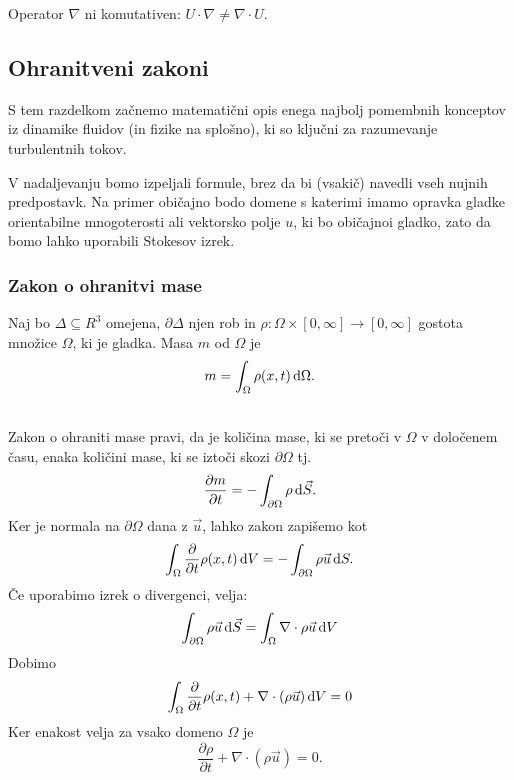\documentclass[mat2, tisk]{fmfdelo}
\begin{document}
\begin{opomba}
Operator $\nabla$ ni komutativen: $U \cdot \nabla \neq \nabla \cdot U$.
\end{opomba}


\subsection{Ohranitveni zakoni}

S tem razdelkom začnemo matematični opis enega najbolj pomembnih konceptov iz dinamike fluidov (in fizike na splošno), 
ki so ključni za razumevanje turbulentnih tokov. 

\begin{opomba}
V nadaljevanju bomo izpeljali formule, brez da bi (vsakič) navedli vseh nujnih predpostavk. Na primer 
običajno bodo domene s katerimi imamo opravka gladke orientabilne mnogoterosti ali vektorsko polje
$u$, ki bo običajnoi gladko, zato da bomo lahko uporabili Stokesov izrek.
\end{opomba}

\subsubsection{Zakon o ohranitvi mase}
Naj bo $\Delta \subseteq R^3$ omejena, $\partial \Delta$ njen rob in $\rho: \Omega \times [0, \infty] \rightarrow [0, \infty]$ 
gostota množice $\Omega$, ki je gladka. Masa $m$ od $\Omega$ je 
$$
m = \int_\Omega \rho(x, t) \dif\Omega.
$$
\begin{center}
\end{center}
~\\[1mm]

Zakon o ohraniti mase pravi, da je količina mase, ki se pretoči v $\Omega$ v določenem času, 
enaka količini mase, ki se iztoči skozi $\partial\Omega$ tj.
$$
\frac{\partial m}{\partial t} = - \int_{\partial \Omega} \rho \dif \vec{S}.
$$
Ker je normala na $\partial \Omega$ dana z $\vec{u}$, lahko zakon zapišemo kot 
$$
\int_\Omega \frac{\partial}{\partial t} \rho(x, t) \dif V = - \int_{\partial \Omega} \rho \vec{u} \dif S.
$$
Če uporabimo izrek o divergenci, velja:
$$
\int_{\partial \Omega} \rho\vec{u} \dif \vec{S} = \int_{\Omega} \nabla \cdot \rho\vec{u} \dif V
$$
Dobimo 
\begin{align*}
\int_\Omega \frac{\partial}{\partial t} \rho(x, t) + \nabla \cdot (\rho\vec{u}) \dif V = 0
\end{align*}
Ker enakost velja za vsako domeno $\Omega$ je
\begin{equation}
\frac{\partial \rho}{\partial t} + \nabla \cdot (\rho\vec{u}) = 0.
\end{equation}
\end{document}
